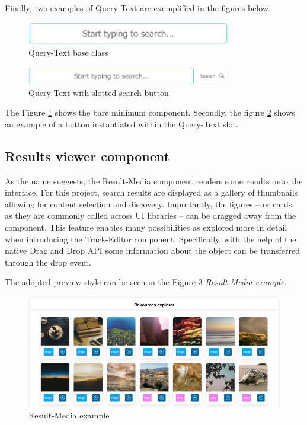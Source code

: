 Finally, two examples of Query Text are exemplified in the figures below.

\begin{figure}[H]
\centering
\includegraphics[width=0.8\textwidth]{images/QueryText.png}
\caption{Query-Text base class}
\label{fig:queryTextBase}
\end{figure}

\begin{figure}[H]
\centering
\includegraphics[width=0.8\textwidth]{images/QueryTextSlotted.png}
\caption{Query-Text with slotted search button}
\label{fig:queryTextSlotted}
\end{figure}

The Figure \ref{fig:queryTextBase} shows the bare minimum component. Secondly, the figure \ref{fig:queryTextSlotted} shows an example of a button instantiated within the Query-Text slot.

\subsection{Results viewer component}
\label{subsec:resultsComponents}

As the name suggests, the Result-Media component renders some results onto the interface. For this project, search results are displayed as a gallery of thumbnails allowing for content selection and discovery. Importantly, the figures – or cards, as they are commonly called across UI libraries – can be dragged away from the component. This feature enables many possibilities as explored more in detail when introducing the Track-Editor component. Specifically, with the help of the native Drag and Drop API some information about the object can be transferred through the drop event.

The adopted preview style can be seen in the Figure \ref{fig:mediaResults} \emph{Result-Media example}.

\begin{figure}[H]
\centering
\includegraphics[width=1\textwidth]{images/ResultsMedia.png}
\caption{Result-Media example}
\label{fig:mediaResults}
\end{figure}

